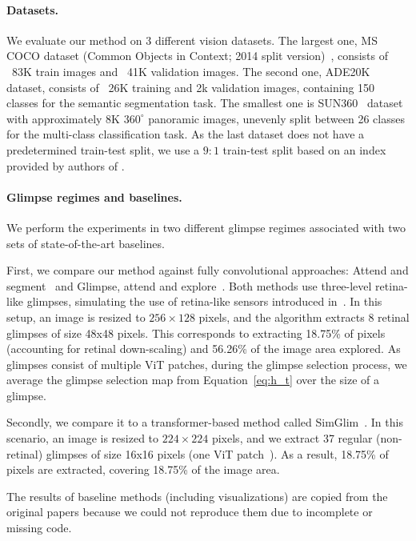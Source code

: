 \documentclass{article}
\begin{document}
\paragraph{Datasets.} We evaluate our method on 3 different vision datasets. The largest one, MS COCO dataset (Common Objects in Context; 2014 split version)~\cite{lin2014microsoft}, consists of ~83K train images and ~41K validation images. The second one, ADE20K~\cite{zhou2017scene} dataset, consists of ~26K training and 2k validation images, containing 150 classes for the semantic segmentation task. The smallest one is SUN360~\cite{song2015sun} dataset with approximately 8K $360^{\circ}$ panoramic images, unevenly split between 26 classes for the multi-class classification task. As the last dataset does not have a predetermined train-test split, we use a $9:1$ train-test split based on an index provided by authors of \cite{seifi2021glimpse}.

\paragraph{Glimpse regimes and baselines.} We perform the experiments in two different glimpse regimes associated with two sets of state-of-the-art baselines.

First, we compare our method against fully convolutional approaches: Attend and segment~\cite{seifi2020segment} and Glimpse, attend and explore~\cite{seifi2021glimpse}. Both methods use three-level retina-like glimpses, simulating the use of retina-like sensors introduced in~\cite{sandini2003retina}. In this setup, an image is resized to $256\times128$ pixels, and the algorithm extracts 8 retinal glimpses of size 48x48 pixels. This corresponds to extracting 18.75\% of pixels (accounting for retinal down-scaling) and 56.26\% of the image area explored. As glimpses consist of multiple ViT patches, during the glimpse selection process, we average the glimpse selection map from Equation~\ref{eq:h_t} over the size of a glimpse.

Secondly, we compare it to a transformer-based method called SimGlim~\cite{Jha2023WACV}. In this scenario, an image is resized to $224 \times 224$ pixels, and we extract 37 regular (non-retinal) glimpses of size 16x16 pixels (one ViT patch~\cite{dosovitskiy2020image}). As a result, 18.75\% of pixels are extracted, covering 18.75\% of the image area.

The results of baseline methods (including visualizations) are copied from the original papers because we could not reproduce them due to incomplete or missing code.
\end{document}
